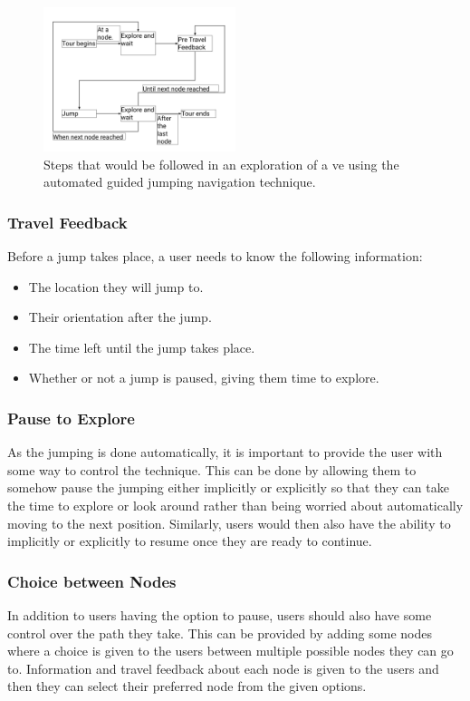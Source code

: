 \begin{figure}[]
	\centering
	\includegraphics[width=0.5\textwidth]{images/interaction-design-steps.pdf}
	\caption{Steps that would be followed in an exploration of a \acrshort{ve} using the automated guided jumping navigation technique.}
	\label{fig:interaction-design-steps}
\end{figure}

\subsubsection{Travel Feedback}
\label{subsubsection AGJ ID ES: Travel Feedback}
Before a jump takes place, a user needs to know the following information:
\begin{itemize}
	\item The location they will jump to.
	\item Their orientation after the jump.
	\item The time left until the jump takes place.
	\item Whether or not a jump is paused, giving them time to explore.
\end{itemize}

\subsubsection{Pause to Explore}
\label{subsubsection AGJ ID ES: Pause to Explore}
As the jumping is done automatically, it is important to provide the user with some way to control the technique. This can be done by allowing them to somehow pause the jumping either implicitly or explicitly so that they can take the time to explore or look around rather than being worried about automatically moving to the next position. Similarly, users would then also have the ability to implicitly or explicitly to resume once they are ready to continue.

\subsubsection{Choice between Nodes}
\label{subsubsection AGJ ID ES: Choice between Nodes}
In addition to users having the option to pause, users should also have some control over the path they take. This can be provided by adding some nodes where a choice is given to the users between multiple possible nodes they can go to. Information and travel feedback about each node is given to the users and then they can select their preferred node from the given options. 

